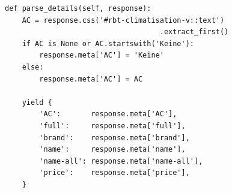 \documentclass{beamer}
\begin{document}
\begin{frame}
\begin{lstlisting}
        \end{lstlisting}
        
	\framebreak
	

		\begin{lstlisting}
def parse_details(self, response):
    AC = response.css('#rbt-climatisation-v::text')
                                    .extract_first()
    if AC is None or AC.startswith('Keine'):
        response.meta['AC'] = 'Keine'
    else:
        response.meta['AC'] = AC
        
    yield {
        'AC':       response.meta['AC'],
        'full':     response.meta['full'],
        'brand':    response.meta['brand'],
        'name':     response.meta['name'],
        'name-all': response.meta['name-all'],
        'price':    response.meta['price'],
    }
        \end{lstlisting}
        
	\framebreak
	
	
\end{frame}

\end{document}
